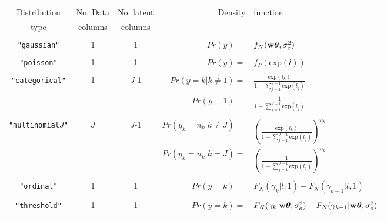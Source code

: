\documentclass{article}
\begin{document}
\begin{landscape}
\LTcapwidth=6.2in
\begin{longtable}{cccrl}
\hline
Distribution   &    No. Data       &         No. latent        &  Density & function \\
   type        &      columns      &           columns            &          &           \\   
\hline\\
   \texttt{"gaussian"}        &  1  &   1  &         $Pr(y) =$&$f_{N}({\bf w}{\bm \theta},\sigma^{2}_{e})$\\   
&&&&\\
   \texttt{"poisson"}        &  1  &   1 &               $Pr(y) =$&$ f_{P}(\textrm{exp}(l))$\\   
&&&&\\
   \texttt{"categorical"}        &  1  &   $J$-1  &     $Pr(y=k | k\neq1) =$&$ \frac{\textrm{exp}(l_{k})}{1+\sum^{J-1}_{j=1}\textrm{exp}(l_{j})}$ \\   
           &   &     &                                  $Pr(y=1) =$&$ \frac{1}{1+\sum^{J-1}_{j=1}\textrm{exp}(l_{j})}$ \\   
&&&&\\
   \texttt{"multinomial$J$"}  &  $J$    &  $J$-1  &     $Pr(y_{k}=n_{k}| k\neq J) =$&$ \left(\frac{\textrm{exp}(l_{k})}{1+\sum^{J-1}_{j=1}\textrm{exp}(l_{j})}\right)^{n_{k}}$ \\   
    &      &   &     $Pr(y_{k}=n_{k} | k=J) =$&$ \left(\frac{1}{1+\sum^{J-1}_{j=1}\textrm{exp}(l_{j})}\right)^{n_{k}}$ \\   
&&&&\\ 
   \texttt{"ordinal"}  &  1    &  1     &              $Pr(y=k) =$&$ F_{N}(\gamma_{k} | l,1)-F_{N}(\gamma_{k-1} | l,1)$ \\   
&&&&\\
   \texttt{"threshold"}  &  1    &  1     &              $Pr(y=k) =$&$ F_{N}(\gamma_{k} | {\bf w}{\bm \theta}, \sigma^{2}_{e})-F_{N}(\gamma_{k-1} | {\bf w}{\bm \theta}, \sigma^{2}_{e})$ \\   
&&&&\\



\end{longtable}
\end{landscape}
\end{document}
